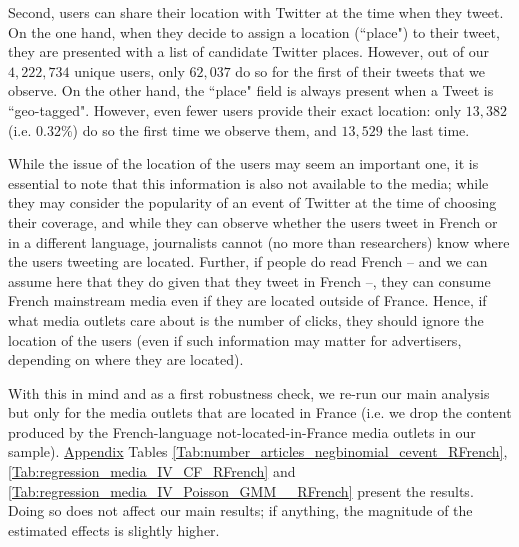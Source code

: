 Second, users can share their location with Twitter at the time when they tweet. On the one hand, when they decide to assign a location (``place") to their tweet, they are presented with a list of candidate Twitter places. However, out of our $4,222,734 $ unique users, only $62,037$ do so for the first of their tweets that we observe. On the other hand, the ``place" field is always present when a Tweet is ``geo-tagged". However, even fewer users provide their exact location: only $13,382$ (i.e. $0.32\%$) do so the first time we observe them, and $13,529$ the last time.

While the issue of the location of the users may seem an important one, it is essential to note that this information is also not available to the media; while they may consider the popularity of an event of Twitter at the time of choosing their coverage, and while they can observe whether the users tweet in French or in a different language, journalists cannot (no more than researchers) know where the users tweeting are located. Further, if people do read French -- and we can assume here that they do given that they tweet in French --, they can consume French mainstream media even if they are located outside of France. Hence, if what media outlets care about is the number of clicks, they should ignore the location of the users (even if such information may matter for advertisers, depending on where they are located).

With this in mind and as a first robustness check, we re-run our main analysis but only for the media outlets that are located in France (i.e. we drop the content produced by the French-language not-located-in-France media outlets in our sample). \hyperlink{ref:Appendix}{Appendix} Tables \ref{Tab:number_articles_negbinomial_cevent_RFrench}, \ref{Tab:regression_media_IV_CF_RFrench} and \ref{Tab:regression_media_IV_Poisson_GMM__RFrench}  present the results. Doing so does not affect our main results; if anything, the magnitude of the estimated effects is slightly higher.





